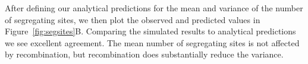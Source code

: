 \documentclass[graybox]{svmult}
\begin{document}
After defining our analytical predictions for the mean and variance of the
number of segregating sites, we then plot the observed and predicted values
in Figure~\ref{fig:segsites}B.
Comparing the simulated results to analytical predictions we see
excellent agreement. The mean number of segregating sites is not
affected by recombination, but recombination does substantially reduce
the variance.



\end{document}

